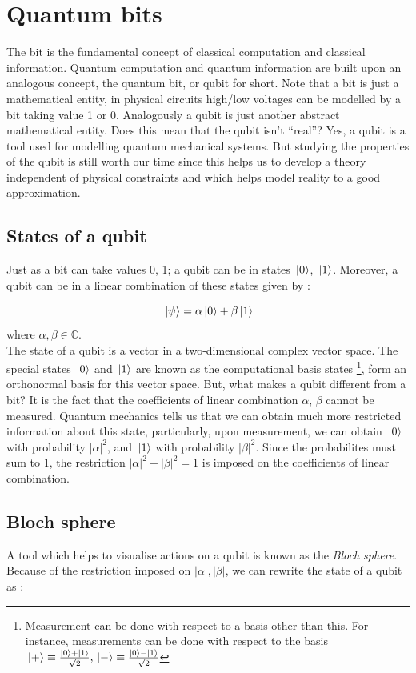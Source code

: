 \documentclass[conference]{IEEEtran}
\newcommand{\C}{\mathbb{C}}
\begin{document}
\section{Quantum bits}
The bit is the fundamental concept of classical computation and classical information. Quantum computation 
and quantum information are built upon an analogous concept, the quantum bit, or qubit for short. Note that 
a bit is just a mathematical entity, in physical circuits high/low voltages can be modelled by a bit taking value
1 or 0. Analogously a qubit is just another abstract mathematical entity. Does this mean that the qubit isn't ``real''?
Yes, a qubit is a tool used for modelling quantum mechanical systems. But studying the properties of the qubit is still 
worth our time since this helps us to develop a theory independent of physical constraints and which helps model reality 
to a good approximation.

\subsection{States of a qubit}
Just as a bit can take values 0, 1; a qubit can be in states $\ket*{0}$, $\ket*{1}$. Moreover, a qubit can be in a linear combination 
of these states given by : 

\begin{equation*}
    \ket*{\psi} = \alpha\ket*{0} + \beta\ket*{1}
\end{equation*}
where $\alpha, \beta \in \C$. \\ 
The state of a qubit is a vector in a two-dimensional complex vector space. The special states $\ket*{0}$ and $\ket*{1}$ are known as 
the computational basis states \footnote{Measurement can be done with respect to a basis other than this. For instance, measurements can be done with respect to the basis $\ket*{+} \equiv \frac{\ket*{0} + \ket*{1}}{\sqrt{2}}, \ket*{-} \equiv \frac{\ket*{0} - \ket*{1}}{\sqrt{2}}$}, form an orthonormal basis for this vector space. 
But, what makes a qubit different from a bit? It is the fact 
that the coefficients of linear combination $\alpha$, $\beta$ cannot be measured. Quantum mechanics tells us that we can obtain much more restricted 
information about this state, particularly, upon measurement, we can obtain $\ket*{0}$ with probability $|\alpha|^2$, and
$\ket*{1}$ with probability $|\beta|^2$. Since the probabilites must sum to 1, the restriction $|\alpha|^2+|\beta|^2 = 1$ is imposed on the
coefficients of linear combination.

\subsection{Bloch sphere}
A tool which helps to visualise actions on a qubit is known as the \textit{Bloch sphere}. Because of the restriction imposed on $|\alpha|, |\beta|$, 
we can rewrite the state of a qubit as : 
\end{document}
